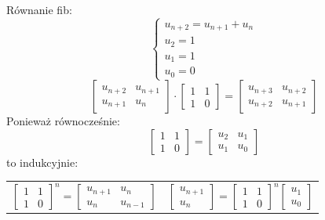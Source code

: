 \documentclass{beamer}
\theoremstyle{definition}
\begin{document}
\begin{frame}{Równanie fib:}
\begin{equation*}
\begin{cases}
u_{n+2} = u_{n+1} + u_n \\
u_{2} = 1 \\
u_{1} = 1 \\
u_{0} = 0 
\end{cases}
\end{equation*}
\begin{equation*}
        \begin{bmatrix}
        u_{n+2} & u_{n+1} \\
        u_{n+1} & u_{n} 
        \end{bmatrix} 
        \cdot
        \begin{bmatrix}
        1 & 1\\
        1 & 0
        \end{bmatrix}
        = 
        \begin{bmatrix}
        u_{n+3} & u_{n+2}\\
        u_{n+2} & u_{n+1}
        \end{bmatrix}
\end{equation*}
Ponieważ równocześnie:
\begin{equation*}
    \begin{bmatrix}
    1 & 1 \\
    1 & 0 
    \end{bmatrix}= 
    \begin{bmatrix}
    u_2 & u_1 \\
    u_1 & u_0
    
    \end{bmatrix}
\end{equation*}
to indukcyjnie: 
\begin{table}[]
    \centering
    \begin{tabular}{c|c}
       \begin{equation*}
    
        \begin{bmatrix}
        1 & 1\\
        1 & 0
        \end{bmatrix}^n
        = 
        \begin{bmatrix}
        u_{n+1} & u_n\\
        u_{n} & u_{n-1}
        \end{bmatrix}

    \end{equation*}
&  
       \begin{equation*}
        \begin{bmatrix}
        u_{n+1} \\
        u_{n}
        \end{bmatrix}
        = 
        \begin{bmatrix}
        1 & 1\\
        1 & 0
        \end{bmatrix}^n
        \begin{bmatrix}
        u_1 \\
        u_0 
        \end{bmatrix}


\end{equation*}
\end{tabular}
\end{table}
\end{frame}
\end{document}
